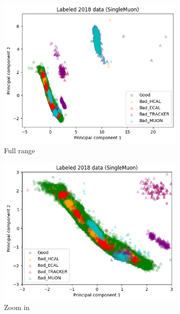 \begin{figure}[h!]
\begin{subfigure}[b]{0.49\linewidth}
        \includegraphics[width=\linewidth]{images/reco/2018/SingleMuon_subsystem_label.png}
        \caption{Full range}
    \end{subfigure}
    \begin{subfigure}[b]{0.49\linewidth}
        \includegraphics[width=\linewidth]{images/reco/2018/SingleMuon_subsystem_label_short_range.png}
        \caption{Zoom in}
    \end{subfigure}
    \begin{subfigure}[b]{0.49\linewidth}

\end{subfigure}
\end{figure}
